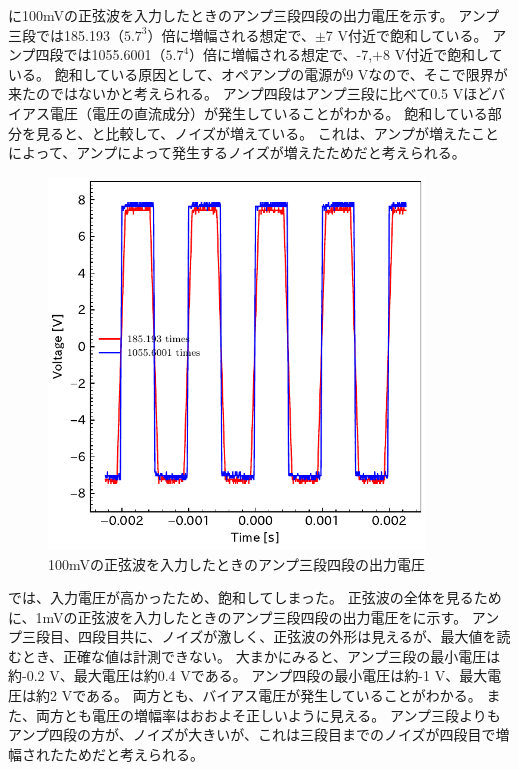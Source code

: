 \documentclass[report.tex]{subfiles}
\begin{document}
に100mVの正弦波を入力したときのアンプ三段四段の出力電圧を示す。
アンプ三段では185.193（\(5.7^3\)）倍に増幅される想定で、\(\pm\)7 V付近で飽和している。
アンプ四段では1055.6001（\(5.7^4\)）倍に増幅される想定で、-7,+8 V付近で飽和している。
飽和している原因として、オペアンプの電源が9 Vなので、そこで限界が来たのではないかと考えられる。
アンプ四段はアンプ三段に比べて0.5 Vほどバイアス電圧（電圧の直流成分）が発生していることがわかる。
飽和している部分を見ると、と比較して、ノイズが増えている。
これは、アンプが増えたことによって、アンプによって発生するノイズが増えたためだと考えられる。

\begin{figure}[H]
	\centering
	\includegraphics[width=10cm]{fig/level34_100m.pdf}
	\caption{100mVの正弦波を入力したときのアンプ三段四段の出力電圧}
	\label{fig:34_100m}
\end{figure}

では、入力電圧が高かったため、飽和してしまった。
正弦波の全体を見るために、1mVの正弦波を入力したときのアンプ三段四段の出力電圧をに示す。
アンプ三段目、四段目共に、ノイズが激しく、正弦波の外形は見えるが、最大値を読むとき、正確な値は計測できない。
大まかにみると、アンプ三段の最小電圧は約-0.2 V、最大電圧は約0.4 Vである。
アンプ四段の最小電圧は約-1 V、最大電圧は約2 Vである。
両方とも、バイアス電圧が発生していることがわかる。
また、両方とも電圧の増幅率はおおよそ正しいように見える。
アンプ三段よりもアンプ四段の方が、ノイズが大きいが、これは三段目までのノイズが四段目で増幅されたためだと考えられる。
\end{document}

